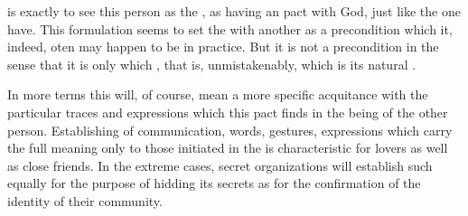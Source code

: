 {\subpa
{} is exactly to 
see this person as  the , as having an 
 pact with God, just like the one  have. 
This formulation seems to set the  with another  
as a precondition which it, indeed, oten may happen to be in practice. 
But it is not a precondition in the sense that it is only  which , that is, unmistakenably, 
 which is its natural .

In more  terms this will, of course, mean a more 
specific acquitance with the particular traces and expressions which 
this pact finds in the being of the other person. 
Establishing  of communication, words, gestures, 
expressions which carry the full meaning only to those initiated in 
the  is characteristic for lovers as well as close 
friends. In the extreme cases, secret organizations will establish 
such  equally for the purpose of hidding its secrets as 
for the confirmation of the identity of their community.

}
